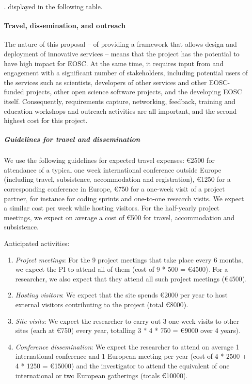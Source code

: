 \ifgrantagreement.\else{} %
displayed in the following table.
\wpfig[label=fig:staffeffort,caption=Summary of Staff Efforts]
\fi

\paragraph{Travel, dissemination, and outreach}

The nature of this proposal -- of providing a framework that allows
design and deployment of innovative services -- means that the project
has the potential to have high impact for EOSC. At the same time, it
requires input from and engagement with a significant number of
stakeholders, including potential users of the services such as
scientists, developers of other services and other EOSC-funded
projects, other open science software projects, and the developing
EOSC itself. Consequently, requirements capture, networking, feedback,
training and education workshops and outreach activities are all
important, and the second highest cost for this project.

\subparagraph{Guidelines for travel and dissemination}
\label{sect:budget-details-travel}

We use the following guidelines for expected travel expenses:
\euro{2500} for attendance of a typical one week international
conference outside Europe (including travel, subsistence,
accommodation and registration), \euro{1250} for a corresponding
conference in Europe, \euro{750} for a one-week visit of a project
partner, for instance for coding sprints and one-to-one
research visits. We expect a similar cost per week while hosting
visitors. For the half-yearly project meetings, we expect on average a
cost of \euro{500} for travel, accommodation and subsistence.

Anticipated activities:

\begin{enumerate}
\item \emph{Project meetings}: For the 9 project meetings that take place every 6 months, we expect
the PI to attend all of them (cost of 9 * 500 = \euro{4500}). For
a researcher, we also expect that they attend all such project meetings
(\euro{4500}).

\item \emph{Hosting visitors}: We expect that the site spends \euro{2000} per year to host
external visitors contributing to the project (total \euro{8000}).

\item \emph{Site visits}: We expect the researcher to carry out 3 one-week visits to other sites
(each at \euro{750}) every year, totalling 3 * 4 * 750 = \euro{9000}
over 4 years).

\item
\emph{ Conference dissemination}: We expect the researcher to attend on average 1
international conference and 1 European meeting per year (cost of 4 *
2500 + 4 * 1250 = \euro{15000}) and the investigator to attend the
equivalent of one international or two
European gatherings (totals \euro{10000}).
\end{enumerate}

